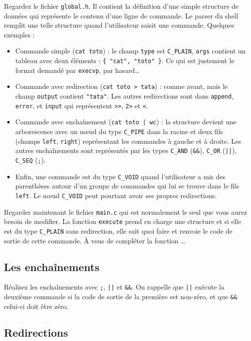 \documentclass[11pt]{article}
\begin{document}
Regardez le fichier \texttt{global.h}. Il contient la définition d'une simple
structure de données qui représente le contenu d'une ligne de commande. Le
parser du shell remplit une telle structure quand l'utilisateur saisit une
commande. Quelques exemples :
\begin{itemize}
\item Commande simple (\texttt{cat toto}) : le champ \texttt{type} est
  \verb+C_PLAIN+, \texttt{args} contient un tableau avec deux
  éléments : \verb+{ "cat", "toto" }+. Ce qui est justement le format
  demandé par \verb+execvp+, par hasard\ldots
\item Commande avec redirection (\verb+cat toto > tata+) : comme avant,
  mais le champ \verb+output+ contient \verb+"tata"+. Les autres redirections
  sont dans \verb+append+, \verb+error+, et \verb+input+ qui représentent
  \verb+>>+, \verb+2>+ et \verb+<+.
\item Commande avec enchaînement (\verb+cat toto | wc+) : la structure devient
  une arborescence avec un nœud du type \verb+C_PIPE+ dans la racine et deux
  fils (champs \verb+left+, \verb+right+) représentant les commandes à gauche
  et à droite. Les autres enchaînements sont représentés par les types
  \verb+C_AND+ (\verb+&&+), \verb+C_OR+ (\verb+||+), \verb+C_SEQ+ (\verb+;+).
\item Enfin, une commande est du type \verb+C_VOID+ quand l'utilisateur a mis
  des parenthèses autour d'un groupe de commandes qui lui se trouve dans
  le fils \texttt{left}. Le nœud \verb+C_VOID+ peut pourtant avoir ses propres
  redirections.
\end{itemize}

Regarder maintenant le fichier \texttt{main.c} qui est normalement le seul
que vous aurez besoin de modifier. La fonction \verb+execute+ prend en charge
une structure et si elle est du type \verb+C_PLAIN+ sans redirection, elle
sait quoi faire et renvoie le code de sortie de cette commande.
À vous de compléter la fonction \ldots

\subsection{Les enchaînements}

Réalisez les enchaînements avec \verb+;+, \verb+||+ et \verb+&&+.
On rappelle que \verb+||+ exécute la deuxième commande si la code
de sortie de la première est non-zéro, et que \verb+&&+ celui-ci
doit être zéro.

\subsection{Redirections}
\end{document}
